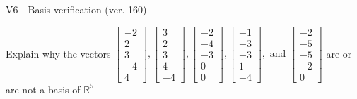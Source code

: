 \begin{exercise}
  \begin{exerciseTitle}V6 - Basis verification (ver. 160)\end{exerciseTitle}
  \begin{exerciseStatement}
    Explain why the vectors \(\left[\begin{array}{r}
-2 \\
2 \\
3 \\
-4 \\
4
\end{array}\right] , \left[\begin{array}{r}
3 \\
2 \\
3 \\
4 \\
-4
\end{array}\right] , \left[\begin{array}{r}
-2 \\
-4 \\
-3 \\
0 \\
0
\end{array}\right] , \left[\begin{array}{r}
-1 \\
-3 \\
-3 \\
1 \\
-4
\end{array}\right] , \text{ and } \left[\begin{array}{r}
-2 \\
-5 \\
-5 \\
-2 \\
0
\end{array}\right]\) are or are not a basis of \(\mathbb{R}^5\)	



\end{exerciseStatement}
\end{exercise}
